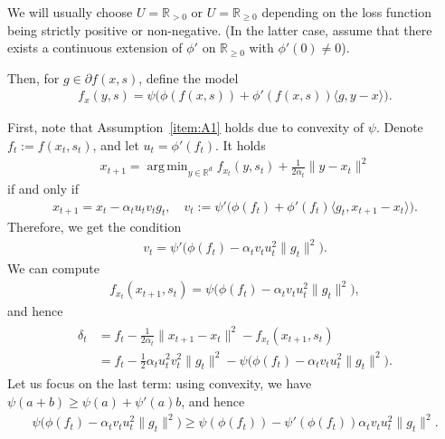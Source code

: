 \documentclass{article}
\let\temp\phi
\let\phi\varphi
\let\varphi\temp
\let\temp\varepsilon
\let\varepsilon\temp
\DeclareMathOperator*{\argmin}{arg\,min}
\newcommand{\iprod}[2]{\langle #1, #2 \rangle}
\newcommand{\R}{\mathbb{R}}
\theoremstyle{plain}
\theoremstyle{definition}
\theoremstyle{remark}
\begin{document}
We will usually choose $U=\R_{>0}$ or $U=\R_{\geq 0}$ depending on the loss function being strictly positive or non-negative. (In the latter case, assume that there exists a continuous extension of $\varphi'$ on $\R_{\geq 0}$ with $\varphi'(0)\neq 0$).  

Then, for $g\in \partial f(x,s)$, define the model
\begin{align} \label{eq:phi-psi-model}
    f_x(y,s) = \psi\big(\varphi(f(x,s)) + \varphi'(f(x,s))\iprod{g}{y-x}\big).
\end{align}

First, note that Assumption~\ref{item:A1} holds due to convexity of $\psi$. Denote $f_t := f(x_t,s_t)$, and 
let $u_t = \varphi'(f_t)$. It holds
\begin{align*}
    x_{t+1} = \argmin_{y\in \R^d}  f_{x_t}(y,s_t) + \frac{1}{2\alpha_t} \|y-x_t\|^2
\end{align*}
if and only if 
\begin{align*}
    x_{t+1} = x_t - \alpha_t u_t v_t g_t, \quad v_t := \psi'\big(\varphi(f_t) + \varphi'(f_t)\iprod{g_t}{x_{t+1}-x_t}\big). 
\end{align*}
Therefore, we get the condition
\begin{align*}
    v_t = \psi'\big(\varphi(f_t) - \alpha_t v_t u_t^2 \|g_t\|^2\big).
\end{align*}
We can compute
\begin{align*}
    f_{x_t}(x_{t+1},s_t) = \psi\big(\varphi(f_t) - \alpha_t v_t u_t^2 \|g_t\|^2\big),
\end{align*}
and hence
\begin{align}\label{eqn:psi-phi-delta}
\begin{split}
    \delta_t &= f_t - \frac{1}{2\alpha_t} \|x_{t+1}-x_t\|^2 - f_{x_t}(x_{t+1},s_t)  \\
    &= f_t - \frac12 \alpha_t u_t^2 v_t^2 \|g_t\|^2 - \psi\big(\varphi(f_t) - \alpha_t v_t u_t^2 \|g_t\|^2\big).
\end{split}
\end{align}
Let us focus on the last term: using convexity, we have $\psi(a+b) \geq \psi(a) + \psi'(a)b$, and hence
\begin{align*}
    \psi\big(\varphi(f_t) - \alpha_t v_t u_t^2 \|g_t\|^2\big) \geq \psi(\varphi(f_t)) - \psi'(\varphi(f_t)) \alpha_t v_t u_t^2 \|g_t\|^2.
\end{align*}
%
\end{document}
